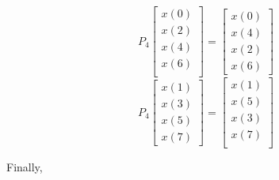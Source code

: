 \documentclass[journal,12pt,twocolumn]{IEEEtran}
\renewcommand\thesection{\arabic{section}}
\begin{document}
\begin{enumerate}[label=\thesection.\arabic*.,ref=\thesection.\theenumi]
\begin{equation}
P_{4}
\begin{bmatrix}
x(0) \\ 
x(2) \\ 
x(4) \\ 
x(6) \\
\end{bmatrix}
 = 
\begin{bmatrix}
x(0) \\ 
x(4) \\ 
x(2) \\
x(6)
\end{bmatrix}
\end{equation}
\begin{equation}
P_{4}
\begin{bmatrix}
x(1) \\ 
x(3) \\ 
x(5) \\
x(7)
\end{bmatrix}
 = 
\begin{bmatrix}
x(1) \\ 
x(5) \\ 
x(3) \\ 
x(7) \\
\end{bmatrix}
\end{equation}

Finally,


\end{enumerate}
\end{document}

